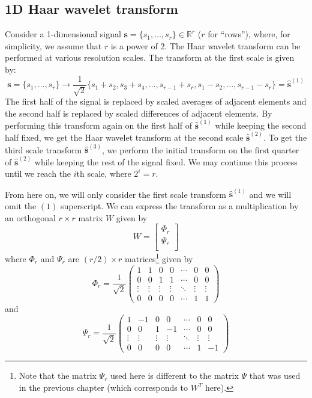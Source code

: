 \documentclass[final,3p]{report}
\let\bs\boldsymbol
\begin{document}
\subsection{1D Haar wavelet transform}
Consider a 1-dimensional signal $\bs s = \{s_1,\dots,s_r\} \in \mathbb{R}^r$ ($r$ for ``rows''), where, for simplicity, we assume that $r$ is a power of 2.
The Haar wavelet transform can be performed at various resolution scales.
The transform at the first scale is given by:
\begin{equation*}
\bs s = \{s_1,\dots,s_r\}\to \frac{1}{\sqrt{2}}\{s_1+s_2,s_3+s_4,\dots,s_{r-1}+s_r,s_1-s_2,\dots,s_{r-1}-s_r\}=\hat{\bs s}^{(1)}
\end{equation*}
The first half of the signal is replaced by scaled averages of adjacent elements and the second half is replaced by scaled differences of adjacent elements.
By performing this transform again on the first half of $\hat{\bs s}^{(1)}$ while keeping the second half fixed, we get the Haar wavelet transform at the second scale $\hat{\bs s}^{(2)}$. 
To get the third scale transform $\hat{\bs s}^{(3)}$, we perform the initial transform on the first quarter of $\hat{\bs s}^{(2)}$ while keeping the rest of the signal fixed.
We may continue this process until we reach the $i$th scale, where $2^i = r$.

From here on, we will only consider the first scale transform $\hat{\bs s}^{(1)}$ and we will omit the $(1)$ superscript.
We can express the transform as a multiplication by an orthogonal $r\times r$ matrix $W$ given by
\begin{equation}
W = \begin{bmatrix}
  \Phi_r \\
  \Psi_r \\
\end{bmatrix}
\end{equation}
where $\Phi_r$ and $\Psi_r$ are $(r/2)\times r$ matrices\footnote{Note that the matrix $\Psi_r$ used here is different to the matrix $\Psi$ that was used in the previous chapter (which corresponds to $W^T$ here).} given by
\begin{equation*}
\Phi_r = \frac{1}{\sqrt{2}} \begin{pmatrix}
1&1&0&0&\cdots&0&0\\
0&0&1&1&\cdots&0&0\\
\vdots&\vdots&\vdots&\vdots&\ddots&\vdots&\vdots\\
0&0&0&0&\cdots&1&1
\end{pmatrix}
\end{equation*}
and 
\begin{equation*}
\Psi_r = \frac{1}{\sqrt{2}} \begin{pmatrix}
1&-1&0&0&\cdots&0&0\\
0&0&1&-1&\cdots&0&0\\
\vdots&\vdots&\vdots&\vdots&\ddots&\vdots&\vdots\\
0&0&0&0&\cdots&1&-1
\end{pmatrix}
\end{equation*}
\end{document}
